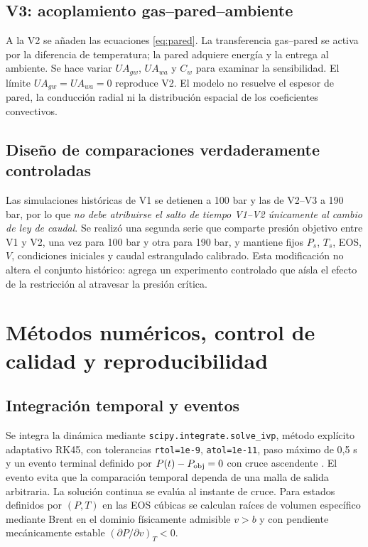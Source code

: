 \documentclass[11pt,letterpaper]{article}
\begin{document}
\subsection{V3: acoplamiento gas--pared--ambiente}
A la V2 se añaden las ecuaciones \eqref{eq:pared}. La transferencia gas--pared se activa por la diferencia de temperatura; la pared adquiere energía y la entrega al ambiente. Se hace variar $UA_{gw}$, $UA_{wa}$ y $C_w$ para examinar la sensibilidad. El límite $UA_{gw}=UA_{wa}=0$ reproduce V2. El modelo no resuelve el espesor de pared, la conducción radial ni la distribución espacial de los coeficientes convectivos.

\subsection{Diseño de comparaciones verdaderamente controladas}
Las simulaciones históricas de V1 se detienen a 100 bar y las de V2--V3 a 190 bar, por lo que \emph{no debe atribuirse el salto de tiempo V1--V2 únicamente al cambio de ley de caudal}. Se realizó una segunda serie que comparte presión objetivo entre V1 y V2, una vez para 100 bar y otra para 190 bar, y mantiene fijos $P_s$, $T_s$, EOS, $V$, condiciones iniciales y caudal estrangulado calibrado. Esta modificación no altera el conjunto histórico: agrega un experimento controlado que aísla el efecto de la restricción al atravesar la presión crítica.

\section{Métodos numéricos, control de calidad y reproducibilidad}
\subsection{Integración temporal y eventos}
Se integra la dinámica mediante \texttt{scipy.integrate.}\allowbreak\texttt{solve\_ivp}, método explícito adaptativo RK45, con tolerancias \texttt{rtol=1e-9}, \texttt{atol=1e-11}, paso máximo de 0,5 s y un evento terminal definido por $P(t)-P_{\rm obj}=0$ con cruce ascendente \citep{Virtanen2020}. El evento evita que la comparación temporal dependa de una malla de salida arbitraria. La solución continua se evalúa al instante de cruce. Para estados definidos por $(P,T)$ en las EOS cúbicas se calculan raíces de volumen específico mediante Brent en el dominio físicamente admisible $v>b$ y con pendiente mecánicamente estable $(\partial P/\partial v)_T<0$.
\end{document}
